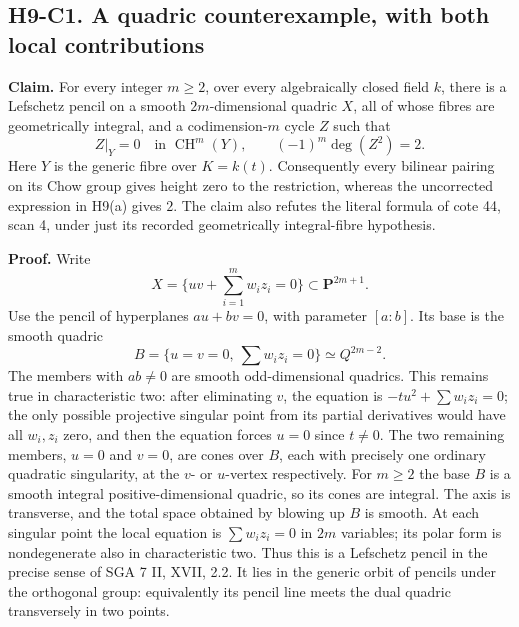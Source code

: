 \documentclass[11pt,a4paper]{article}
\begin{document}
\subsection*{H9-C1. A quadric counterexample, with both local contributions}

\textbf{Claim.} For every integer $m\geq2$, over every algebraically closed
field $k$, there is a
Lefschetz pencil on a smooth $2m$-dimensional quadric $X$, all of whose fibres
are geometrically integral, and a codimension-$m$ cycle $Z$ such that
\[
 Z|_{Y}=0\quad\text{in }\operatorname{CH}^{m}(Y),\qquad
 (-1)^m\deg(Z^2)=2.
\]
Here $Y$ is the generic fibre over $K=k(t)$. Consequently every
bilinear pairing on its Chow group gives height zero to the restriction,
whereas the uncorrected expression in H9(a) gives $2$. The claim also
refutes the literal formula of cote 44, scan 4, under just its recorded
geometrically integral-fibre hypothesis.

\textbf{Proof.}
Write
\[
 X=\{uv+\textstyle\sum_{i=1}^{m} w_i z_i=0\}
       \subset\mathbf P^{2m+1}.
\]
Use the pencil of hyperplanes $a u+b v=0$, with parameter $[a:b]$.
Its base is the smooth quadric
\[
 B=\{u=v=0,\ \textstyle\sum w_i z_i=0\}\simeq Q^{2m-2}.
\]
The members with $ab\ne0$ are smooth odd-dimensional quadrics. This remains
true in characteristic two: after eliminating $v$, the equation is
$-t u^2+\sum w_i z_i=0$; the only possible projective singular point
from its partial derivatives would have all $w_i,z_i$ zero, and then
the equation forces $u=0$ since $t\ne0$. The two
remaining members, $u=0$ and $v=0$, are cones over $B$, each with precisely
one ordinary quadratic singularity, at the $v$- or $u$-vertex respectively.
For $m\geq2$ the base $B$ is a smooth integral positive-dimensional quadric,
so its cones are integral. The axis is transverse, and the total space
obtained by blowing up $B$ is smooth. At each singular point the local
equation is $\sum w_i z_i=0$ in $2m$ variables; its polar form is
nondegenerate also in characteristic two. Thus this is a Lefschetz pencil in
the precise sense of SGA 7 II, XVII, 2.2. It lies in the generic orbit of
pencils under the orthogonal group: equivalently its pencil line meets the
dual quadric transversely in two points.
\end{document}
